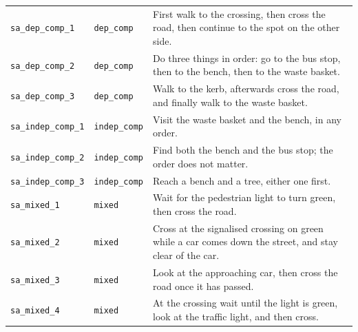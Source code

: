 \begin{longtable}{@{}p{3.5cm}p{2.5cm}p{6.2cm}@{}}
\texttt{sa\_dep\_comp\_1} & \texttt{dep\_comp} & First walk to the crossing, then cross the road, then continue to the spot on the other side. \\
\texttt{sa\_dep\_comp\_2} & \texttt{dep\_comp} & Do three things in order: go to the bus stop, then to the bench, then to the waste basket. \\
\texttt{sa\_dep\_comp\_3} & \texttt{dep\_comp} & Walk to the kerb, afterwards cross the road, and finally walk to the waste basket. \\
\texttt{sa\_indep\_comp\_1} & \texttt{indep\_comp} & Visit the waste basket and the bench, in any order. \\
\texttt{sa\_indep\_comp\_2} & \texttt{indep\_comp} & Find both the bench and the bus stop; the order does not matter. \\
\texttt{sa\_indep\_comp\_3} & \texttt{indep\_comp} & Reach a bench and a tree, either one first. \\
\texttt{sa\_mixed\_1} & \texttt{mixed} & Wait for the pedestrian light to turn green, then cross the road. \\
\texttt{sa\_mixed\_2} & \texttt{mixed} & Cross at the signalised crossing on green while a car comes down the street, and stay clear of the car. \\
\texttt{sa\_mixed\_3} & \texttt{mixed} & Look at the approaching car, then cross the road once it has passed. \\
\texttt{sa\_mixed\_4} & \texttt{mixed} & At the crossing wait until the light is green, look at the traffic light, and then cross. \\
\bottomrule
\end{longtable}
